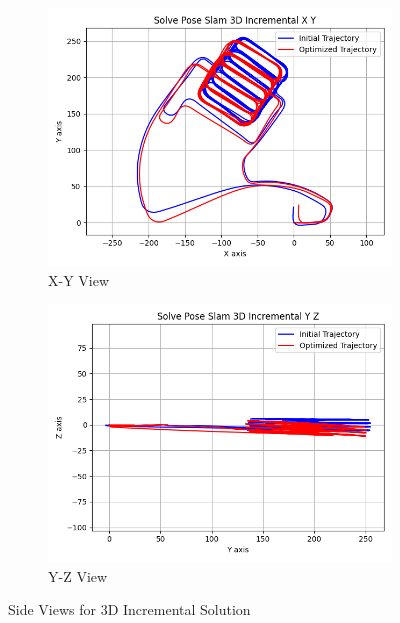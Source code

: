 \documentclass[11pt, oneside, letter]{article}
\begin{document}
\begin{enumerate}[A.]
\begin{figure}[H]
    \centering
    \begin{subfigure}[b]{0.45\columnwidth}
        \centering
        \includegraphics[width=\columnwidth]{../figures/solve_pose_slam_3d_incremental_x_y.png}
        \caption{X-Y View}
        \label{fig:solve_pose_slam_3d_incremental_x_y}
    \end{subfigure}
    \begin{subfigure}[b]{0.45\columnwidth}
        \centering
        \includegraphics[width=\columnwidth]{../figures/solve_pose_slam_3d_incremental_y_z.png}
        \caption{Y-Z View}
        \label{fig:solve_pose_slam_3d_incremental_y_z}
    \end{subfigure}
    \caption{Side Views for 3D Incremental Solution}
    \label{fig:solve_pose_slam_3d_incremental_view}
\end{figure}


\end{enumerate}
\end{document}
